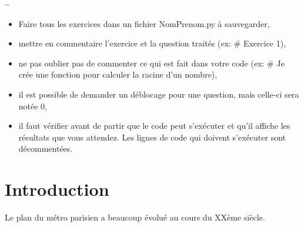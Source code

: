 

\begin{center}
{\Large\bf {\type} \no {\numero} -- \descrip}
\end{center}


\begin{boxedminipage}{.9\textwidth} 
\begin{itemize}
 \item Faire tous les exercices dans un fichier {NomPrenom.py} à sauvegarder,
 \item mettre en commentaire l'exercice et la question traités (ex: \# Exercice 1),
 \item ne pas oublier pas de commenter ce qui est fait dans votre code (ex: \# Je crée une fonction pour calculer la racine d'un nombre),
 \item il est possible de demander un déblocage pour une question, mais celle-ci sera notée 0,
 \item il faut vérifier avant de partir que le code peut s'exécuter et qu'il affiche les résultats que vous attendez. Les lignes de code qui doivent s'exécuter sont décommentées.
\end{itemize}
\end{boxedminipage}

\section{Introduction}

Le plan du métro parisien a beaucoup évolué au cours du XXème siècle.

~\

